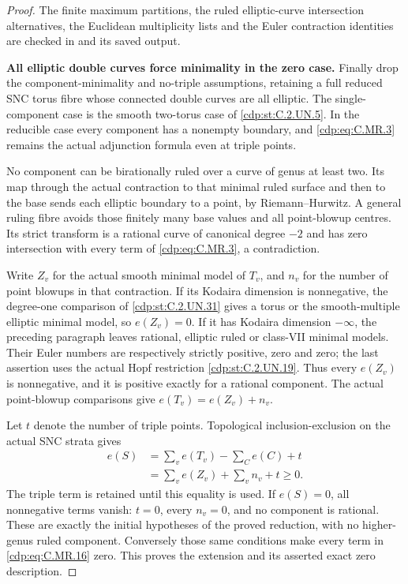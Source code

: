 \begin{proof}
The finite maximum partitions,
the ruled elliptic-curve
intersection alternatives,
the Euclidean multiplicity
lists and the Euler
contraction identities are
checked in
and its saved output.

\par\medskip\noindent\textbf{All elliptic double curves force minimality in the zero case.}
Finally drop the component-minimality and no-triple
assumptions, retaining a full reduced SNC torus fibre
whose connected double curves are all elliptic.
The single-component case is the smooth two-torus
case of \ref{cdp:st:C.2.UN.5}. In the reducible case every component
has a nonempty boundary, and \eqref{cdp:eq:C.MR.3} remains the
actual adjunction formula even at triple points.

No component can be birationally ruled over a
curve of genus at least two. Its map through
the actual contraction to that minimal ruled
surface and then to the base sends each
elliptic boundary to a point, by
Riemann--Hurwitz. A general ruling fibre
avoids those finitely many base values and
all point-blowup centres. Its strict
transform is a rational curve of
canonical degree $-2$ and has zero
intersection with every term of
\eqref{cdp:eq:C.MR.3}, a contradiction.

Write $Z_v$ for the actual smooth minimal
model of $T_v$, and $n_v$ for the number
of point blowups in that contraction.
If its Kodaira dimension is nonnegative,
the degree-one comparison of \ref{cdp:st:C.2.UN.31} gives
a torus or the smooth-multiple elliptic
minimal model, so $e(Z_v)=0$. If it has
Kodaira dimension $-\infty$, the preceding
paragraph leaves rational, elliptic ruled
or class-VII minimal models. Their Euler
numbers are respectively strictly positive,
zero and zero; the last assertion uses
the actual Hopf restriction \ref{cdp:st:C.2.UN.19}.
Thus every $e(Z_v)$ is nonnegative,
and it is positive exactly for a
rational component. The actual
point-blowup comparisons give
$e(T_v)=e(Z_v)+n_v$.

Let $t$ denote the number of triple
points. Topological inclusion-exclusion
on the actual SNC strata gives
\[
 \begin{aligned}
 e(S)&=\sum_v e(T_v)-\sum_C e(C)+t\\
     &=\sum_v e(Z_v)+\sum_v n_v+t
                                      \ge0.
 \end{aligned}
\tag{C.MR.16}\label{cdp:eq:C.MR.16}
\]
The triple term is retained until this
equality is used. If $e(S)=0$, all
nonnegative terms vanish: $t=0$,
every $n_v=0$, and no component is
rational. These are exactly the
initial hypotheses of the proved
reduction, with no higher-genus ruled
component. Conversely those same
conditions make every term in
\eqref{cdp:eq:C.MR.16} zero. This proves the
extension and its asserted exact
zero description.
\end{proof}


